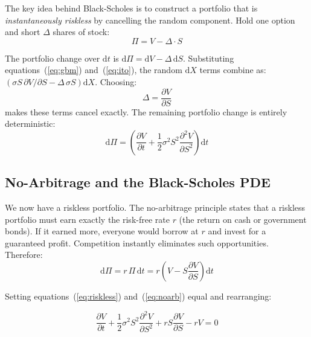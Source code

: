 \documentclass[12pt]{article}
\begin{document}
The key idea behind Black-Scholes is to construct a portfolio that is
\textit{instantaneously riskless} by cancelling the random component. Hold one
option and short $\Delta$ shares of stock:
\begin{equation}
  \Pi = V - \Delta \cdot S
  \label{eq:portfolio}
\end{equation}

The portfolio change over $\mathrm{d}t$ is $\mathrm{d}\Pi = \mathrm{d}V -
\Delta\,\mathrm{d}S$. Substituting equations~(\ref{eq:gbm}) and~(\ref{eq:ito}),
the random $\mathrm{d}X$ terms combine as:
$\left(\sigma S\,\partial V/\partial S - \Delta\,\sigma S\right)\mathrm{d}X$.
Choosing:
\begin{equation}
  \Delta = \frac{\partial V}{\partial S}
  \label{eq:delta}
\end{equation}
makes these terms cancel exactly. The remaining portfolio change is entirely deterministic:
\begin{equation}
  \mathrm{d}\Pi = \left(\frac{\partial V}{\partial t}
    + \frac{1}{2}\sigma^2 S^2 \frac{\partial^2 V}{\partial S^2}\right)\mathrm{d}t
  \label{eq:riskless}
\end{equation}

\subsection{No-Arbitrage and the Black-Scholes PDE}
\label{sec:bspde}

We now have a riskless portfolio. The no-arbitrage principle states that a riskless
portfolio must earn exactly the risk-free rate $r$ (the return on cash or government
bonds). If it earned more, everyone would borrow at $r$ and invest for a guaranteed
profit. Competition instantly eliminates such opportunities. Therefore:
\begin{equation}
  \mathrm{d}\Pi = r\,\Pi\,\mathrm{d}t = r\!\left(V - S\frac{\partial V}{\partial S}\right)\mathrm{d}t
  \label{eq:noarb}
\end{equation}

Setting equations~(\ref{eq:riskless}) and~(\ref{eq:noarb}) equal and rearranging:

\begin{eqbox}
\begin{equation}
  \frac{\partial V}{\partial t}
  + \frac{1}{2}\sigma^2 S^2 \frac{\partial^2 V}{\partial S^2}
  + rS\frac{\partial V}{\partial S}
  - rV = 0
  \label{eq:bspde}
\end{equation}
\end{eqbox}
\end{document}
